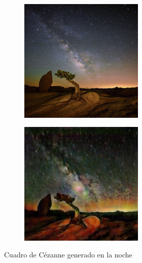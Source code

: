 \documentclass[[../main.tex]{subfiles}
\begin{document}
        \begin{figure}[!htb]
            \begin{subfigure}[b]{0.49\textwidth}
            \includegraphics[width=0.65\textwidth]{imagenes/imagen2cuadro/dataset/cezanne/2014-08-09 00_16_45.jpg}
            \end{subfigure}
        \hfill
            \begin{subfigure}[b]{0.49\textwidth}
            \includegraphics[width=0.65\textwidth]{imagenes/imagen2cuadro/dataset/cezanne/2014-08-09 00_16_45_2.jpg}
            \end{subfigure}
        \caption{Cuadro de Cézanne generado en la noche}
        \label{fig:cezanne_cuadro_dataset_noche}
        \end{figure}
        
\end{document}
